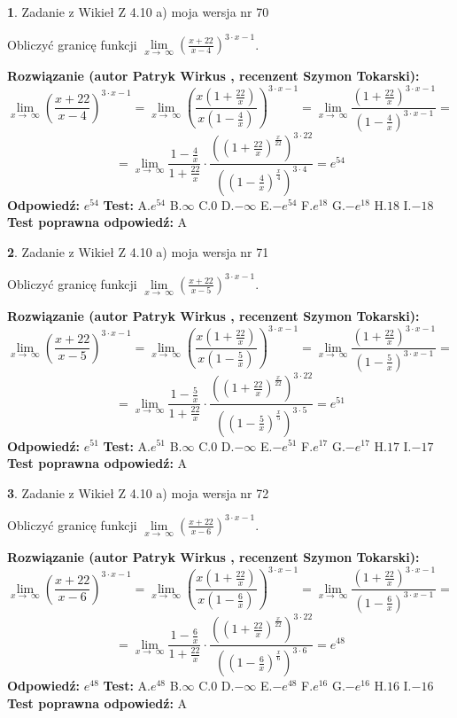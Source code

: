 \documentclass[12pt, a4paper]{article}
\theoremstyle{definition} %
\newtheorem{zad}{}
\newcommand{\zadStart}[1]{\begin{zad}#1\newline}
\newcommand{\zadStop}{\end{zad}}
\newcommand{\rozwStart}[2]{\noindent \textbf{Rozwiązanie (autor #1 , recenzent #2): }\newline}
\newcommand{\rozwStop}{\newline}
\newcommand{\odpStart}{\noindent \textbf{Odpowiedź:}\newline}
\newcommand{\odpStop}{\newline}
\newcommand{\testStart}{\noindent \textbf{Test:}\newline}
\newcommand{\testStop}{\newline}
\newcommand{\kluczStart}{\noindent \textbf{Test poprawna odpowiedź:}\newline}
\newcommand{\kluczStop}{\newline}
\begin{document}
\zadStart{Zadanie z Wikieł Z 4.10 a) moja wersja nr 70}

Obliczyć granicę funkcji  $\lim\limits_{x\to\ \infty}(\frac{x+22}{x-4})^{3\cdot x-1}$.
\zadStop
\rozwStart{Patryk Wirkus}{Szymon Tokarski}
$$\lim\limits_{x\to\ \infty}(\frac{x+22}{x-4})^{3\cdot x-1} = \lim\limits_{x\to\ \infty}(\frac{x(1+\frac{22}{x})}{x(1-\frac{4}{x})})^{3\cdot x-1}=\lim\limits_{x\to\ \infty}\frac{(1+\frac{22}{x})^{3\cdot x-1}}{(1-\frac{4}{x})^{3\cdot x-1}}=$$
$$=\lim\limits_{x\to\ \infty}\frac{1-\frac{4}{x}}{1+\frac{22}{x}}\cdot\frac{((1+\frac{22}{x})^{\frac{x}{22}})^{3\cdot22}}{((1-\frac{4}{x})^{\frac{x}{4}})^{3\cdot4}}=e^{54}$$
\rozwStop
\odpStart
$e^{54}$
\odpStop
\testStart
A.$e^{54}$ B.$\infty$ C.$0$ D.$-\infty$ E.$-e^{54}$
F.$e^{18}$ G.$-e^{18}$
H.$18$
I.$-18$
\testStop
\kluczStart
A
\kluczStop



\zadStart{Zadanie z Wikieł Z 4.10 a) moja wersja nr 71}

Obliczyć granicę funkcji  $\lim\limits_{x\to\ \infty}(\frac{x+22}{x-5})^{3\cdot x-1}$.
\zadStop
\rozwStart{Patryk Wirkus}{Szymon Tokarski}
$$\lim\limits_{x\to\ \infty}(\frac{x+22}{x-5})^{3\cdot x-1} = \lim\limits_{x\to\ \infty}(\frac{x(1+\frac{22}{x})}{x(1-\frac{5}{x})})^{3\cdot x-1}=\lim\limits_{x\to\ \infty}\frac{(1+\frac{22}{x})^{3\cdot x-1}}{(1-\frac{5}{x})^{3\cdot x-1}}=$$
$$=\lim\limits_{x\to\ \infty}\frac{1-\frac{5}{x}}{1+\frac{22}{x}}\cdot\frac{((1+\frac{22}{x})^{\frac{x}{22}})^{3\cdot22}}{((1-\frac{5}{x})^{\frac{x}{5}})^{3\cdot5}}=e^{51}$$
\rozwStop
\odpStart
$e^{51}$
\odpStop
\testStart
A.$e^{51}$ B.$\infty$ C.$0$ D.$-\infty$ E.$-e^{51}$
F.$e^{17}$ G.$-e^{17}$
H.$17$
I.$-17$
\testStop
\kluczStart
A
\kluczStop



\zadStart{Zadanie z Wikieł Z 4.10 a) moja wersja nr 72}

Obliczyć granicę funkcji  $\lim\limits_{x\to\ \infty}(\frac{x+22}{x-6})^{3\cdot x-1}$.
\zadStop
\rozwStart{Patryk Wirkus}{Szymon Tokarski}
$$\lim\limits_{x\to\ \infty}(\frac{x+22}{x-6})^{3\cdot x-1} = \lim\limits_{x\to\ \infty}(\frac{x(1+\frac{22}{x})}{x(1-\frac{6}{x})})^{3\cdot x-1}=\lim\limits_{x\to\ \infty}\frac{(1+\frac{22}{x})^{3\cdot x-1}}{(1-\frac{6}{x})^{3\cdot x-1}}=$$
$$=\lim\limits_{x\to\ \infty}\frac{1-\frac{6}{x}}{1+\frac{22}{x}}\cdot\frac{((1+\frac{22}{x})^{\frac{x}{22}})^{3\cdot22}}{((1-\frac{6}{x})^{\frac{x}{6}})^{3\cdot6}}=e^{48}$$
\rozwStop
\odpStart
$e^{48}$
\odpStop
\testStart
A.$e^{48}$ B.$\infty$ C.$0$ D.$-\infty$ E.$-e^{48}$
F.$e^{16}$ G.$-e^{16}$
H.$16$
I.$-16$
\testStop
\kluczStart
A
\kluczStop
\end{document}
